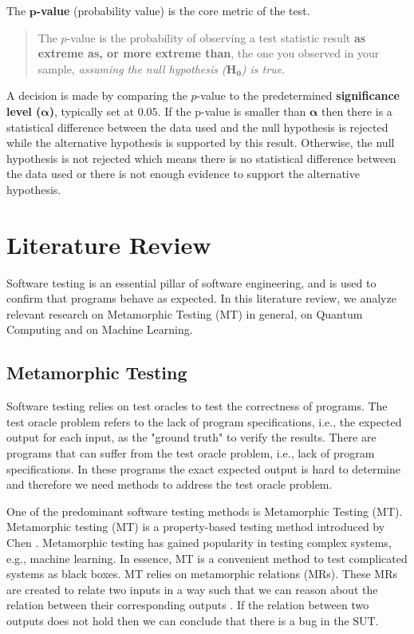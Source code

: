 \documentclass[12pt,a4paper]{article}
\begin{document}
	The $\boldsymbol{p}$\textbf{-value} (probability value) is the core metric of the test.
	
	\begin{quote}
		The $p$-value is the probability of observing a test statistic result \textbf{as extreme as, or more extreme than}, the one you observed in your sample, \textit{assuming the null hypothesis ($\mathbf{H_0}$) is true}.
	\end{quote}
	
	A decision is made by comparing the $p$-value to the predetermined \textbf{significance level ($\boldsymbol{\alpha}$)}, typically set at $0.05$. If the p-value is smaller than $\boldsymbol{\alpha}$ then there is a statistical difference between the data used and the null hypothesis is rejected while the alternative hypothesis is supported by this result. Otherwise, the null hypothesis is not rejected which means there is no statistical difference between the data used or there is not enough evidence to support the alternative hypothesis.
	
	\section{Literature Review}
	\label{sec:LiteratureReview}
	Software testing is an essential pillar of software engineering, and is used to confirm that programs behave as expected. In this literature review, we analyze relevant research on Metamorphic Testing (MT) in general, on Quantum Computing and on Machine Learning.
	
	\subsection{Metamorphic Testing}
		\label{sec:LiteratureReview-Metamorphic-Testing}
	
	
	Software testing relies on test oracles to test the correctness of programs. The test oracle problem refers to the lack of program specifications, i.e., the expected output for each input, as the "ground truth" to verify the results. There are programs that can suffer from the test oracle problem, i.e., lack of program specifications. In these programs the exact expected output is hard to determine and therefore we need methods to address the test oracle problem. 
	
	One of the predominant software testing methods is Metamorphic Testing (MT). Metamorphic testing (MT) is a property-based testing method introduced by Chen \cite{mt1998}. Metamorphic testing has gained popularity in testing complex systems, e.g., machine learning. In essence, MT is a convenient method to test complicated systems as black boxes. MT relies on metamorphic relations (MRs). These MRs are created to relate two inputs in a way such that we can reason about the relation between their corresponding outputs \cite{xu2024mrscoutautomatedsynthesismetamorphic}. If the relation between two outputs does not hold then we can conclude that there is a bug in the SUT.
	
\end{document}
